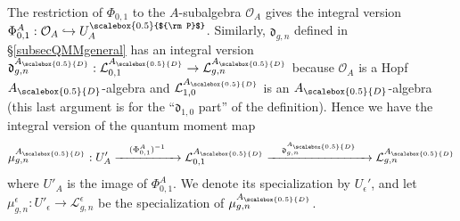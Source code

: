 \documentclass[11pt]{amsart}
\newcommand{\e}{\epsilon}
\newcommand{\Oo}{\mathcal{O}}
\newcommand{\AD}{A_{\scalebox{0.5}{D}}}
\newcommand{\Pup}{{\scalebox{0.5}{${\rm P}$}}}
\begin{document}
\indent The restriction of $\Phi_{0,1}$ to the $A$-subalgebra $\mathcal{O}_A$ gives the integral version $\Phi_{0,1}^A : \mathcal{O}_A \hookrightarrow U_A^\Pup$. Similarly, $\mathfrak{d}_{g,n}$ defined in \S\ref{subsecQMMgeneral} has an integral version $\mathfrak{d}_{g,n}^{\AD} : \mathcal{L}_{0,1}^{\AD} \to \mathcal{L}_{g,n}^{\AD}$ because $\Oo_{A}$ is a Hopf $\AD$-algebra and $\mathcal{L}_{1,0}^{\AD}$ is an $\AD$-algebra (this last argument is for the ``$\mathfrak{d}_{1,0}$ part'' of the definition). Hence we have the integral version of the quantum moment map
\[ \mu_{g,n}^{\AD} : U_A' \xrightarrow{\quad (\Phi_{0,1}^A)^{-1} \quad} \mathcal{L}_{0,1}^{\AD} \xrightarrow{\quad \mathfrak{d}_{g,n}^{\AD} \quad} \mathcal{L}_{g,n}^{\AD} \]
where $U'_A$ is the image of $\Phi_{0,1}^A$. We denote its specialization by $U_\e'$, and let $\mu_{g,n}^{\e} : U'_{\e} \to \mathcal{L}_{g,n}^{\e}$ be the specialization of $\mu_{g,n}^{\AD}$.
\end{document}
